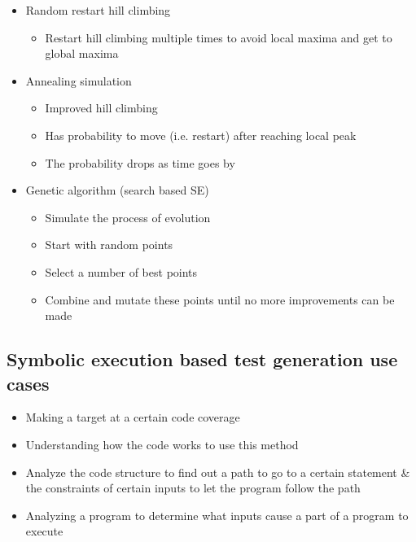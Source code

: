 \documentclass[12pt]{book}
\begin{document}
\begin{itemize}
\begin{itemize}
        \item Random restart hill climbing
        \begin{itemize}
            \item Restart hill climbing multiple times to avoid local maxima and get to global maxima
        \end{itemize}

        \item Annealing simulation
        \begin{itemize}
            \item Improved hill climbing
            \item Has probability to move (i.e. restart) after reaching local peak
            \item The probability drops as time goes by
        \end{itemize} 

        \item Genetic algorithm (search based SE)
        \begin{itemize}
            \item Simulate the process of evolution
            \item Start with random points
            \item Select a number of best points
            \item Combine and mutate these points until no more improvements can be made
        \end{itemize}
    \end{itemize}
\end{itemize}

\subsection{Symbolic execution based test generation use cases}
\begin{itemize}
    \item Making a target at a certain code coverage
    \item Understanding how the code works to use this method
    \item Analyze the code structure to find out a path to go to a certain statement \& the constraints of certain inputs to let the program follow the path
    \item Analyzing a program to determine what inputs cause a part of a program to execute
\end{itemize} 
\end{document}
